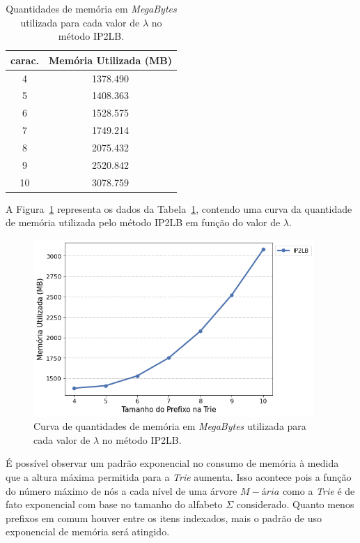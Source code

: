 \begin{table}[!ht]
\centering
\begin{tabular}{|c|c|}
\hline
\textbf{carac.} & \textbf{Memória Utilizada (MB)} \\ \hline
4 & 1378.490 \\ \hline
5 & 1408.363 \\ \hline
6 & 1528.575 \\ \hline
7 & 1749.214 \\ \hline
8 & 2075.432 \\ \hline
9 & 2520.842 \\ \hline
10 & 3078.759 \\ \hline
\end{tabular}
\caption{Quantidades de memória em \textit{MegaBytes} utilizada para cada valor de $\lambda$ no método IP2LB.}
\label{tab:memory-usage-usaddr-tau-3}
\end{table}

A Figura~\ref{fig:memory-usage-usaddr-tau-3} representa os dados da Tabela~\ref{tab:memory-usage-usaddr-tau-3}, contendo uma curva da quantidade de memória utilizada pelo método IP2LB em função do valor de $\lambda$.

\begin{figure}[!ht]
    \centering
    \includegraphics[width=0.95\textwidth]{figures/memory_usage_IP2LB_dataset_usaddr_tau_3.png}
    \caption{Curva de quantidades de memória em \textit{MegaBytes} utilizada para cada valor de $\lambda$ no método IP2LB.}
    \label{fig:memory-usage-usaddr-tau-3}
\end{figure}

É possível observar um padrão exponencial no consumo de memória à medida que a altura máxima permitida para a \textit{Trie} aumenta. Isso acontece pois a função do número máximo de nós a cada nível de uma árvore $M-\text{á}ria$ como a \textit{Trie} \citep{Knuth:1998} é de fato exponencial com base no tamanho do alfabeto $\Sigma$ considerado. Quanto menos prefixos em comum houver entre os itens indexados, mais o padrão de uso exponencial de memória será atingido.

